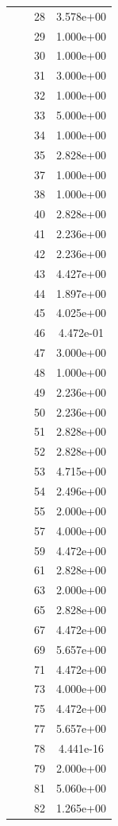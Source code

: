 \documentclass[12pt]{article}
\begin{document}
\begin{longtable}{@{}cccc@{}}
 &  & 28 & 3.578e+00 \\
 &  & 29 & 1.000e+00 \\
 &  & 30 & 1.000e+00 \\
 &  & 31 & 3.000e+00 \\
 &  & 32 & 1.000e+00 \\
 &  & 33 & 5.000e+00 \\
 &  & 34 & 1.000e+00 \\
 &  & 35 & 2.828e+00 \\
 &  & 37 & 1.000e+00 \\
 &  & 38 & 1.000e+00 \\
 &  & 40 & 2.828e+00 \\
 &  & 41 & 2.236e+00 \\
 &  & 42 & 2.236e+00 \\
 &  & 43 & 4.427e+00 \\
 &  & 44 & 1.897e+00 \\
 &  & 45 & 4.025e+00 \\
 &  & 46 & 4.472e-01 \\
 &  & 47 & 3.000e+00 \\
 &  & 48 & 1.000e+00 \\
 &  & 49 & 2.236e+00 \\
 &  & 50 & 2.236e+00 \\
 &  & 51 & 2.828e+00 \\
 &  & 52 & 2.828e+00 \\
 &  & 53 & 4.715e+00 \\
 &  & 54 & 2.496e+00 \\
 &  & 55 & 2.000e+00 \\
 &  & 57 & 4.000e+00 \\
 &  & 59 & 4.472e+00 \\
 &  & 61 & 2.828e+00 \\
 &  & 63 & 2.000e+00 \\
 &  & 65 & 2.828e+00 \\
 &  & 67 & 4.472e+00 \\
 &  & 69 & 5.657e+00 \\
 &  & 71 & 4.472e+00 \\
 &  & 73 & 4.000e+00 \\
 &  & 75 & 4.472e+00 \\
 &  & 77 & 5.657e+00 \\
 &  & 78 & 4.441e-16 \\
 &  & 79 & 2.000e+00 \\
 &  & 81 & 5.060e+00 \\
 &  & 82 & 1.265e+00 \\

\end{longtable}
\end{document}
